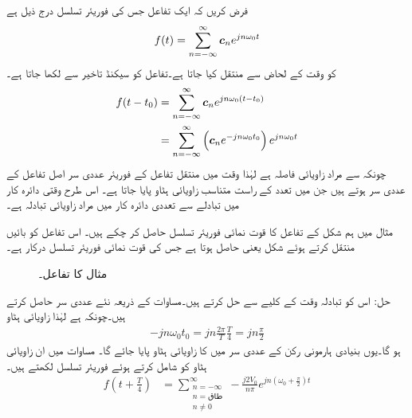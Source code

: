 فرض کریں کہ ایک تفاعل جس کی فوریئر تسلسل درج ذیل ہے
\begin{align}
f(t)=\sum_{n=-\infty}^{\infty} {{\boldsymbol{c}}}_n e^{jn\omega_0 t}
\end{align}
کو وقت کے لحاض سے منتقل کیا جاتا ہے۔تفاعل  کو  سیکنڈ تاخیر سے   لکھا جاتا ہے۔
\begin{gather}
\begin{aligned}\label{مساوات_فوریئر_تبادلہ_وقت}
f(t-t_0)&=\sum_{n=-\infty}^{\infty} {{\boldsymbol{c}}}_n e^{jn\omega_0 (t-t_0)}\\
&=\sum_{n=-\infty}^{\infty} \left({{\boldsymbol{c}}}_n e^{-jn\omega_0 t_0}\right) e^{jn\omega_0 t}
\end{aligned}
\end{gather}
چونکہ  سے مراد زاویائی فاصلہ ہے لہٰذا وقت میں منتقل تفاعل  کے فوریئر عددی سر اصل تفاعل  کے عددی سر ہوتے ہیں جن میں تعدد کے راست متناسب زاویائی ہٹاو   پایا جاتا ہے۔ اس طرح وقتی دائرہ کار میں تبادلے سے  تعددی دائرہ کار میں مراد  زاویائی تبادلہ ہے۔

مثال  میں ہم شکل  کے تفاعل  کا قوت نمائی فوریئر تسلسل حاصل کر چکے ہیں۔ اس تفاعل کو  بائیں منتقل کرتے ہوئے شکل  یعنی  حاصل ہوتا ہے جس کی قوت نمائی فوریئر تسلسل درکار ہے۔
\begin{figure}
\centering
{}
\caption{مثال  کا تفاعل۔}
\label{شکل_فوریئر_دندان_منتقل_دوبارہ}
\end{figure}%
حل: اس کو تبادلہ وقت کے کلیے سے حل کرتے ہیں۔مساوات  کے ذریعہ نئے عددی سر حاصل کرتے ہیں۔چونکہ  ہے لہٰذا زاویائی ہٹاو
\begin{align*}
-jn\omega_0 t_0=jn \frac{2\pi}{T} \frac{T}{4}=jn\frac{\pi}{2}
\end{align*}
ہو گا۔یوں بنیادی ہارمونی رکن کے عددی سر میں  کا زاویائی ہٹاو پایا جائے گا۔ مساوات  میں ان زاویائی ہٹاو کو شامل کرتے ہوئے فوریئر تسلسل لکھتے ہیں۔
\begin{align}
f\left(t+\frac{T}{4}\right)&=\sum_{\substack{n=-\infty \\ n=\text{طاق}\\ n \ne 0} }^{\infty} -\frac{j2V_0}{n\pi}e^{jn\left(\omega_0 +\frac{\pi}{2}\right)t}
\end{align}

